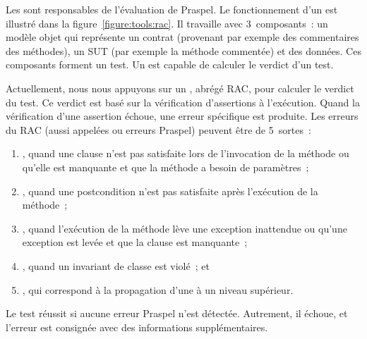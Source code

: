 Les  sont responsables de l'évaluation de Praspel.
Le fonctionnement d'un  est illustré dans la
figure~\ref{figure:tools:rac}. Il travaille avec 3~composants~: un modèle objet
 qui représente un contrat (provenant par exemple des commentaires
des méthodes), un SUT  (par exemple la méthode commentée) et des
données. Ces composants forment un test. Un  est
capable de calculer le verdict d'un test.

Actuellement, nous nous appuyons sur un ,
abrégé RAC, pour calculer le verdict du test. Ce verdict est basé sur la
vérification d'assertions à l'exécution. Quand la vérification d'une assertion
échoue, une erreur spécifique est produite. Les erreurs du RAC (aussi appelées
 ou erreurs Praspel) peuvent être de 5~sortes~:
%
\begin{enumerate}

\item {}, quand une clause \arequires n'est pas
satisfaite lors de l'invocation de la méthode ou qu'elle est manquante et que la
méthode a besoin de paramètres~;

\item {}, quand une postcondition n'est pas
satisfaite après l'exécution de la méthode~;

\item {}, quand l'exécution de la méthode lève une
exception inattendue ou qu'une exception est levée et que la clause \athrowable
est manquante~;

\item {}, quand un invariant de classe est violé~; et

\item {}, qui correspond à la propagation
d'une  à un niveau supérieur.

\end{enumerate}
%
Le test réussit si aucune erreur Praspel n'est détectée. Autrement, il échoue,
et l'erreur est consignée avec des informations supplémentaires.

